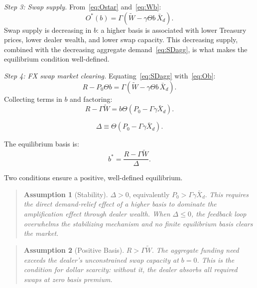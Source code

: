 \textit{Step 3: Swap supply.} From~\eqref{eq:Ostar} and~\eqref{eq:Wb}:
\begin{equation}
  O^*(b) = \Gamma\!\left(\tilde{W} - \gamma\Theta b\,\bar{X}_d\right).
  \tag{O-b}
  \label{eq:Ob}
\end{equation}
Swap supply is decreasing in $b$: a higher basis is associated with lower Treasury prices, lower
dealer wealth, and lower swap capacity. This decreasing supply, combined with the decreasing
aggregate demand~\eqref{eq:SDagg}, is what makes the equilibrium condition well-defined.

\textit{Step 4: FX swap market clearing.} Equating~\eqref{eq:SDagg} with~\eqref{eq:Ob}:
\[
  R - P_0\Theta b = \Gamma\!\left(\tilde{W} - \gamma\Theta b\,\bar{X}_d\right).
\]
Collecting terms in $b$ and factoring:
\[
  R - \Gamma\tilde{W} = b\Theta(P_0 - \Gamma\gamma\bar{X}_d).
\]

\begin{definition}
\label{def:delta}
\begin{equation}
  \Delta \equiv \Theta(P_0 - \Gamma\gamma\bar{X}_d).
  \tag{$\Delta$-def}
  \label{eq:Delta}
\end{equation}
\end{definition}

The equilibrium basis is:
\begin{equation}
  b^* = \frac{R - \Gamma\tilde{W}}{\Delta}.
  \tag{EQ}
  \label{eq:EQ}
\end{equation}

Two conditions ensure a positive, well-defined equilibrium.

\begin{quote}
\textbf{Assumption 1} (Stability). $\Delta > 0$, equivalently $P_0 > \Gamma\gamma\bar{X}_d$.
\textit{This requires the direct demand-relief effect of a higher basis to dominate the
amplification effect through dealer wealth. When $\Delta \leq 0$, the feedback loop overwhelms
the stabilizing mechanism and no finite equilibrium basis clears the market.}
\end{quote}

\begin{quote}
\textbf{Assumption 2} (Positive Basis). $R > \Gamma\tilde{W}$.
\textit{The aggregate funding need exceeds the dealer's unconstrained swap capacity at $b = 0$.
This is the condition for dollar scarcity: without it, the dealer absorbs all required swaps at
zero basis premium.}
\end{quote}

